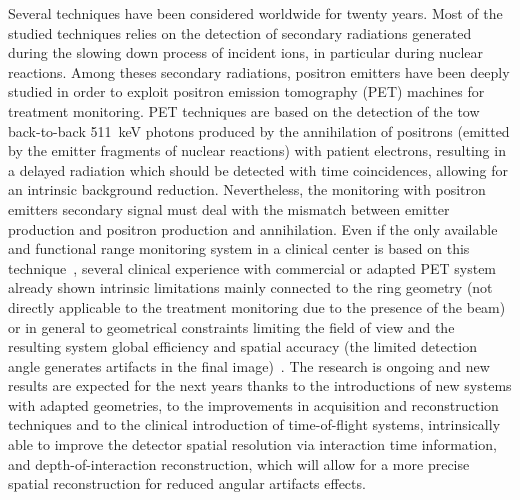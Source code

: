 Several techniques have been considered worldwide for twenty years. Most of the studied techniques relies on the detection of secondary radiations generated during the slowing down process of incident ions, in particular during nuclear reactions. Among theses secondary radiations, positron emitters have been deeply studied in order to exploit positron emission tomography (PET) machines for treatment monitoring. PET techniques are based on the detection of the tow back-to-back 511~keV photons produced by the annihilation of positrons (emitted by the emitter fragments of nuclear reactions) with patient electrons, resulting in a delayed radiation which should be detected with time coincidences, allowing for an intrinsic background reduction. Nevertheless, the monitoring with positron emitters secondary signal must deal with the mismatch between emitter production and positron production and annihilation. Even if the only available and functional range monitoring system in a clinical center is based on this technique~\cite{ENGHARDT2004}, several clinical experience with commercial or adapted PET system already shown intrinsic limitations mainly connected to the ring geometry (not directly applicable to the treatment monitoring due to the presence of the beam) or in general to geometrical constraints limiting the field of view and the resulting system global efficiency and spatial accuracy (the limited detection angle generates artifacts in the final image)~\cite{PARODI2016}. The research is ongoing and new results are expected for the next years thanks to the introductions of new systems with adapted geometries, to the improvements in acquisition and reconstruction techniques and to the clinical introduction of time-of-flight systems, intrinsically able to improve the detector spatial resolution via interaction time information, and depth-of-interaction reconstruction, which will allow for a more precise spatial reconstruction for reduced angular artifacts effects.\\
